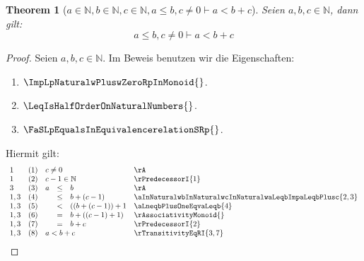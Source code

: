 \documentclass{book}
\theoremstyle{plain}
\newtheorem{theorem}{Theorem}
\theoremstyle{remark}
\theoremstyle{definition}
\begin{document}
\label{aInNaturalwbInNaturalwcInNaturalwaLeqbwcNotEqualsZeroImpaLneqbPlusc}
\begin{theorem}[\(a\in\mathbb{N},b\in\mathbb{N},c\in\mathbb{N}, a\leq b,c\neq 0\vdash a<b+c\)]
Seien \(a,b,c\in\mathbb{N}\), dann gilt:
\[a\leq b,c\neq 0\vdash a<b+c\]
\end{theorem}
\begin{proof}
        Seien \(a,b,c\in\mathbb{N}\). Im Beweis benutzen wir die Eigenschaften:
\begin{enumerate}
    \item \(\ImpLpNaturalwPluswZeroRpInMonoid{}\).
    \item \(\LeqIsHalfOrderOnNaturalNumbers{}\).
    \item \(\FaSLpEqualsInEquivalencerelationSRp{}\).
\end{enumerate}
Hiermit gilt:
\[
\begin{array}{llclll}
            1 & (1) & \multicolumn{3}{l}{c\neq 0}  & \rA \\
            1 & (2) & \multicolumn{3}{l}{c-1\in\mathbb{N}}  & \rPredecessorI{1} \\
            3 & (3) & a&\leq &b  & \rA  \\
            1,3 & (4) & &\leq &b+(c-1)  &  \aInNaturalwbInNaturalwcInNaturalwaLeqbImpaLeqbPlusc{2,3} \\
            1,3 & (5) & &< &((b+(c-1))+1  &  \aLneqbPlusOneEqvaLeqb{4} \\
            1,3 & (6) & &=& b+((c-1)+1) & \rAssociativityMonoid{} \\
            1,3 & (7) & &=& b+c & \rPredecessorI{2} \\
            1,3 & (8) & \multicolumn{3}{l}{a<b+c} & \rTransitivityEqRI{3,7} \\
\end{array}
\]
\end{proof}
\end{document}
